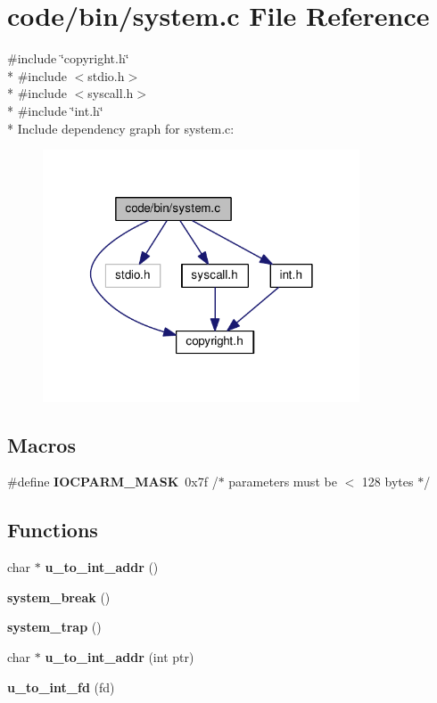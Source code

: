\section{code/bin/system.c File Reference}
\label{system_8c}
{\ttfamily \#include \char`\"{}copyright.\+h\char`\"{}}\\*
{\ttfamily \#include $<$stdio.\+h$>$}\\*
{\ttfamily \#include $<$syscall.\+h$>$}\\*
{\ttfamily \#include \char`\"{}int.\+h\char`\"{}}\\*
Include dependency graph for system.\+c\+:
\nopagebreak
\begin{figure}[H]
\begin{center}
\leavevmode
\includegraphics[width=266pt]{system_8c__incl}
\end{center}
\end{figure}
\subsection*{Macros}
\begin{DoxyCompactItemize}
\item 
\#define {\bf I\+O\+C\+P\+A\+R\+M\+\_\+\+M\+A\+SK}~0x7f	/$\ast$ parameters must be $<$ 128 bytes $\ast$/
\end{DoxyCompactItemize}
\subsection*{Functions}
\begin{DoxyCompactItemize}
\item 
char $\ast$ {\bf u\+\_\+to\+\_\+int\+\_\+addr} ()
\item 
{\bf system\+\_\+break} ()
\item 
{\bf system\+\_\+trap} ()
\item 
char $\ast$ {\bf u\+\_\+to\+\_\+int\+\_\+addr} (int ptr)
\item 
{\bf u\+\_\+to\+\_\+int\+\_\+fd} (fd)
\end{DoxyCompactItemize}
